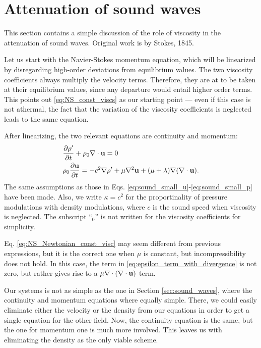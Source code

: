 \section{Attenuation of sound waves}
\label{sec:sound_waves_att}

This section contains a simple discussion of the role of viscosity in
the attenuation of sound waves. Original work is by Stokes, 1845.

Let us start with the Navier-Stokes momentum equation, which will be
linearized by disregarding high-order deviations from equilibrium
values. The two viscosity coefficients always multiply the velocity
terms. Therefore, they are at to be taken at their equilibrium values,
since any departure would entail higher order terms. This points out
\ref{eq:NS_const_viscs} as our starting point --- even if this case
is not athermal, the fact that the variation of the viscosity
coefficients is neglected leads to the same equation.


After linearizing, the two relevant equations are continuity and
momentum:
\begin{align}
  & \frac{\partial\rho' }{\partial t}  + \rho_0 \nabla\cdot\mathbf{u} =0 \\
  & \label{eq:NS_Newtonian_const_visc}
    \rho_0 \frac{\partial \mathbf{u} }{\partial t} =
    - c^2 \nabla \rho' + \mu \nabla^2 \mathbf{u}
    + ( \mu + \lambda ) \nabla ( \nabla\cdot\mathbf{u} ) .
\end{align}
The same assumptions as those in
Eqs. \ref{eq:sound_small_u}-\ref{eq:sound_small_p} have been made.
Also, we write $\kappa = c^2$ for the proportinality of pressure
modulations with density modulations, where $c$ is the sound speed
when viscosity is neglected. The subscript ``$_0$'' is not written for
the viscosity coefficients for simplicity.

Eq. \ref{eq:NS_Newtonian_const_visc} may seem different from previous
expressions, but it is the correct one when $\mu$ is constant, but
incompressibility does not hold. In this case, the term in
\ref{eq:epsilon_term_with_divergence} is not zero, but rather gives
rise to a $\mu \nabla\cdot ( \nabla\cdot\mathbf{u} )$ term.

Our systems is not as simple as the one in Section
\ref{sec:sound_waves}, where the continuity and momentum equations
where equally simple. There, we could easily eliminate either the
velocity or the density from our equations in order to get a single
equation for the other field. Now, the continuity equation is the
same, but the one for momentum one is much more involved. This leaves
us with eliminating the density as the only viable scheme.

